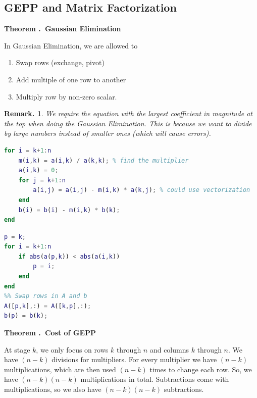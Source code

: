 \documentclass[12pt, a4paper]{article}
\newcounter{index}[subsection]
\newenvironment*{thm}[1]{\begin{tcolorbox}\par\noindent\textbf{Theorem \thesubsection.\stepcounter{index}\theindex\ #1} \par}{\par\end{tcolorbox}}
\newtheorem{rmk}{Remark.}[section]
\begin{document}
\subsection{GEPP and Matrix Factorization}
\begin{thm}{Gaussian Elimination}
	In Gaussian Elimination, we are allowed to 
	\begin{enumerate}
		\item Swap rows (exchange, pivot)
		\item Add multiple of one row to another
		\item Multiply row by non-zero scalar. 
	\end{enumerate}
\end{thm}
\begin{rmk}We require the equation with the largest coefficient in magnitude at the top when doing the Gaussian Elimination. This is because we want to divide by large numbers instead of smaller ones (which will cause errors).\end{rmk}
\begin{algorithm}\caption{General Structure of GEPP}

\BlankLine{}
\end{algorithm}
\begin{lstlisting}[language = Matlab, title = {At stage $k$, eliminate $x_k$, from rows $k+1$ to $n$}]
for i = k+1:n
	m(i,k) = a(i,k) / a(k,k); % find the multiplier
	a(i,k) = 0;
	for j = k+1:n
		a(i,j) = a(i,j) - m(i,k) * a(k,j); % could use vectorization
	end
	b(i) = b(i) - m(i,k) * b(k);
end
\end{lstlisting}
\begin{lstlisting}[language = Matlab, title = {Pivoting at stage $k$: find the coefficient with the largest magnitude}]
%% The code tells us which row has the pivot.
p = k;
for i = k+1:n
	if abs(a(p,k)) < abs(a(i,k))
		p = i;
	end
end
%% Swap rows in A and b
A([p,k],:) = A([k,p],:);
b(p) = b(k);
\end{lstlisting}
\begin{thm}{Cost of GEPP}
	At stage $k$, we only focus on rows $k$ through $n$ and columns $k$ through $n$. We have $(n-k)$ divisions for multipliers. For every multiplier we have $(n-k)$ multiplications, which are then used $(n-k)$ times to change each row. So, we have $(n-k)(n-k)$ multiplications in total. Subtractions come with multiplications, so we also have $(n-k)(n-k)$ subtractions. 
\end{thm}
\end{document}
